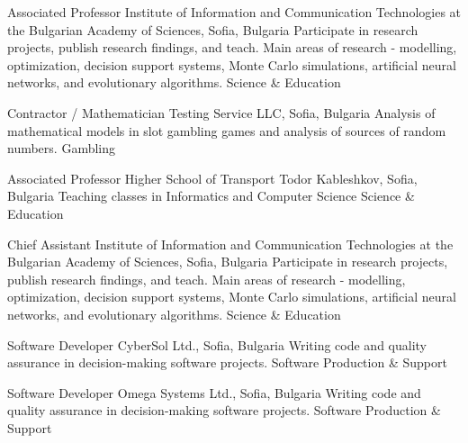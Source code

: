 \documentclass[english,a4paper]{europasscv}
\begin{document}
  \begin{europasscv}

  \ecvpersonalinfo


  
   {Associated Professor}
  \ecvitem {} {Institute of Information and Communication Technologies at the Bulgarian Academy of Sciences, Sofia, Bulgaria}
  \ecvitem {} {Participate in research projects, publish research findings, and teach. Main areas of research - modelling, optimization, decision support systems, Monte Carlo simulations, artificial neural networks, and evolutionary algorithms.}
  \ecvitem {} { \quad Science \& Education}

   {Contractor / Mathematician}
  \ecvitem {} {Testing Service LLC, Sofia, Bulgaria}
  \ecvitem {} {Analysis of mathematical models in slot gambling games and analysis of sources of random numbers.}
  \ecvitem {} { \quad Gambling}

   {Associated Professor}
  \ecvitem {} {Higher School of Transport Todor Kableshkov, Sofia, Bulgaria}
  \ecvitem {} {Teaching classes in Informatics and Computer Science}
  \ecvitem {} { \quad Science \& Education}
  
   {Chief Assistant}
  \ecvitem {} {Institute of Information and Communication Technologies at the Bulgarian Academy of Sciences, Sofia, Bulgaria}
  \ecvitem {} {Participate in research projects, publish research findings, and teach. Main areas of research - modelling, optimization, decision support systems, Monte Carlo simulations, artificial neural networks, and evolutionary algorithms.}
  \ecvitem {} { \quad Science \& Education}
  
   {Software Developer}
  \ecvitem {} {CyberSol Ltd., Sofia, Bulgaria}
  \ecvitem {} {Writing code and quality assurance in decision-making software projects.}
  \ecvitem {} { \quad Software Production \& Support}
  
   {Software Developer}
  \ecvitem {} {Omega Systems Ltd., Sofia, Bulgaria}
  \ecvitem {} {Writing code and quality assurance in decision-making software projects.}
  \ecvitem {} { \quad Software Production \& Support}
  

\end{europasscv}
\end{document}
